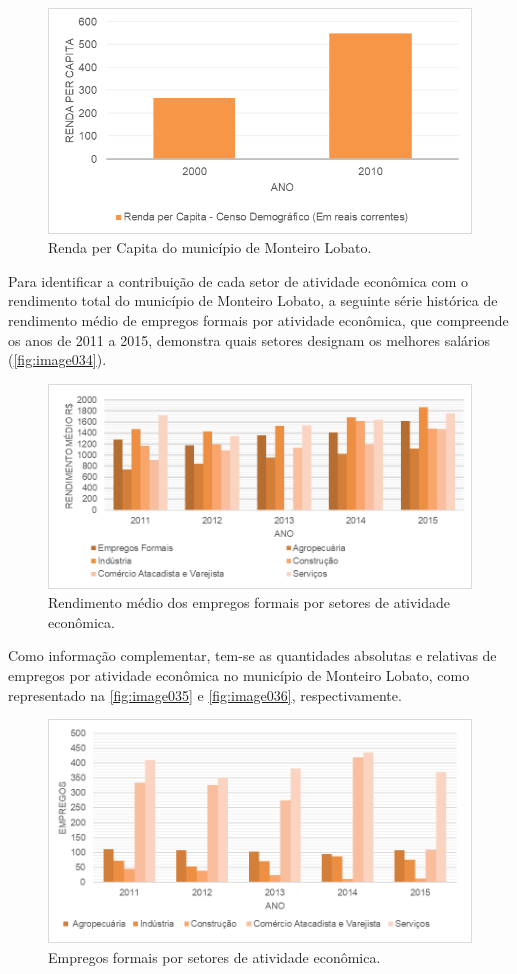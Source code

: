 \begin{figure}[h!]
	\centering
	\includegraphics[width=0.75\linewidth]{produtos/proddois/image033}
	\caption{Renda per Capita do município de Monteiro Lobato.}
	\label{fig:image033}
\end{figure}

Para identificar a contribuição de cada setor de atividade econômica com o rendimento total do município de Monteiro Lobato, a seguinte série histórica de rendimento médio de empregos formais por atividade econômica, que compreende os anos de 2011 a 2015, demonstra quais setores designam os melhores salários (\autoref{fig:image034}).
 
 \begin{figure}[h!]
 	\centering
 	\includegraphics[width=0.8\linewidth]{produtos/proddois/image034}
 	\caption{Rendimento médio dos empregos formais por setores de atividade econômica.}
 	\label{fig:image034}
 \end{figure}

Como informação complementar, tem-se as quantidades absolutas e relativas de empregos por atividade econômica no município de Monteiro Lobato, como representado na \autoref{fig:image035} e \autoref{fig:image036}, respectivamente.
 
 \begin{figure}[h!]
 	\centering
 	\includegraphics[width=1\linewidth]{produtos/proddois/image035}
 	\caption{Empregos formais por setores de atividade econômica.}
 	\label{fig:image035}
 \end{figure}
 
